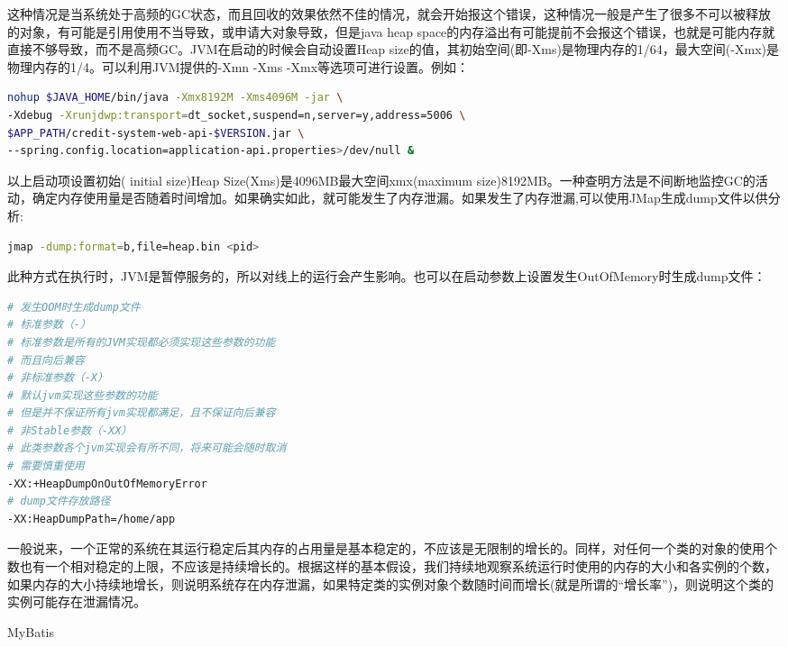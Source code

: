 \documentclass[12pt]{book}
\makeatletter
\numberwithin{dummy}{section}
\theoremstyle{ocrenumbox}
\theoremstyle{blacknumex}
\theoremstyle{blacknumbox}
\theoremstyle{ocrenum}
\renewcommand{\section}{\@startsection{section}{1}{\z@}
	{-4ex \@plus -1ex \@minus -.4ex}
	{1ex \@plus.2ex }
	{\normalfont\large\sffamily\bfseries}}
\makeatother
\begin{document}
这种情况是当系统处于高频的GC状态，而且回收的效果依然不佳的情况，就会开始报这个错误，这种情况一般是产生了很多不可以被释放的对象，有可能是引用使用不当导致，或申请大对象导致，但是java heap space的内存溢出有可能提前不会报这个错误，也就是可能内存就直接不够导致，而不是高频GC。JVM在启动的时候会自动设置Heap size的值，其初始空间(即-Xms)是物理内存的1/64，最大空间(-Xmx)是物理内存的1/4。可以利用JVM提供的-Xmn -Xms -Xmx等选项可进行设置。例如：

\begin{lstlisting}[language=Bash]
nohup $JAVA_HOME/bin/java -Xmx8192M -Xms4096M -jar \
-Xdebug -Xrunjdwp:transport=dt_socket,suspend=n,server=y,address=5006 \
$APP_PATH/credit-system-web-api-$VERSION.jar \
--spring.config.location=application-api.properties>/dev/null &
\end{lstlisting}

以上启动项设置初始( initial size)Heap Size(Xms)是4096MB最大空间xmx(maximum size)8192MB。一种查明方法是不间断地监控GC的活动，确定内存使用量是否随着时间增加。如果确实如此，就可能发生了内存泄漏。如果发生了内存泄漏,可以使用JMap生成dump文件以供分析:

\begin{lstlisting}[language=Bash]
jmap -dump:format=b,file=heap.bin <pid> 
\end{lstlisting}

此种方式在执行时，JVM是暂停服务的，所以对线上的运行会产生影响。也可以在启动参数上设置发生OutOfMemory时生成dump文件：

\begin{lstlisting}[language=Bash]
# 发生OOM时生成dump文件
# 标准参数（-）
# 标准参数是所有的JVM实现都必须实现这些参数的功能
# 而且向后兼容
# 非标准参数（-X）
# 默认jvm实现这些参数的功能
# 但是并不保证所有jvm实现都满足，且不保证向后兼容
# 非Stable参数（-XX）
# 此类参数各个jvm实现会有所不同，将来可能会随时取消
# 需要慎重使用
-XX:+HeapDumpOnOutOfMemoryError
# dump文件存放路径
-XX:HeapDumpPath=/home/app
\end{lstlisting}

一般说来，一个正常的系统在其运行稳定后其内存的占用量是基本稳定的，不应该是无限制的增长的。同样，对任何一个类的对象的使用个数也有一个相对稳定的上限，不应该是持续增长的。根据这样的基本假设，我们持续地观察系统运行时使用的内存的大小和各实例的个数，如果内存的大小持续地增长，则说明系统存在内存泄漏，如果特定类的实例对象个数随时间而增长(就是所谓的“增长率”)，则说明这个类的实例可能存在泄漏情况。

\section{MyBatis}
\end{document}
